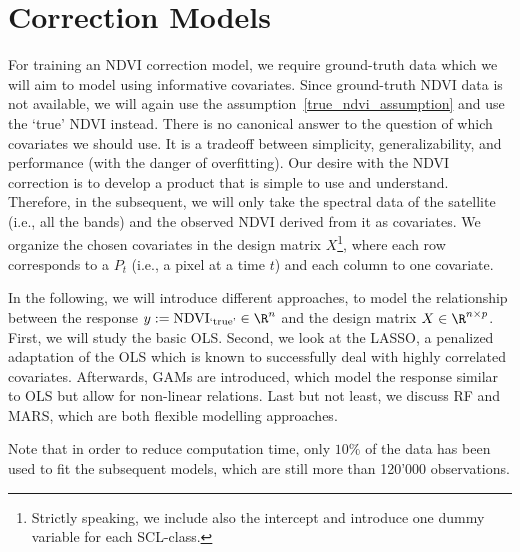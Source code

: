 \section{Correction Models}{
        \label{sec:corr_data_table}
        \label{sec:corr_methods}

    For training an NDVI correction model, we require ground-truth data which we will aim to model using informative covariates. Since ground-truth NDVI data is not available, we will again use the assumption~\ref{true_ndvi_assumption} and use the `true' NDVI instead. There is no canonical answer to the question of which covariates we should use. It is a tradeoff between simplicity, generalizability, and performance (with the danger of overfitting). 
    Our desire with the NDVI correction is to develop a product that is simple to use and understand. Therefore, in the subsequent, we will only take the spectral data of the satellite (i.e., all the bands) and the observed NDVI derived from it as covariates. We organize the chosen covariates in the design matrix $X$\footnote{Strictly speaking, we include also the intercept and introduce one dummy variable for each SCL-class.}, where each row corresponds to a $P_t$ (i.e., a pixel at a time $t$) and each column to one covariate.    

    In the following, we will introduce different approaches, to model the relationship between the response $y:=\operatorname{NDVI}_\text{`true'}\in \R^n$ and the design matrix $X\in\R^{n \times p}$. First, we will study the basic OLS. Second, we look at the LASSO, a penalized adaptation of the OLS which is known to successfully deal with highly correlated covariates. Afterwards, GAMs are introduced, which model the response similar to OLS but allow for non-linear relations. Last but not least, we discuss RF and MARS, which are both flexible modelling approaches. %

    Note that in order to reduce computation time, only $10\%$ of the data has been used to fit the subsequent models, which are still more than 120'000 observations. 
    
    
}

